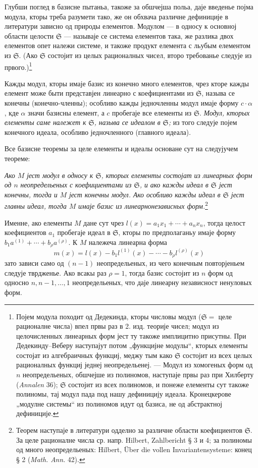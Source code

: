 ﻿\documentclass[11pt]{article}
\providecommand{\frS}{\mathfrak S}
\begin{document}
Глубши поглед в базисне пытаньа, такоже за обшчејша польа, даје введенье појма модула, кторы треба разумети тако, же он обхвача различне дефиниције в литератури зависно од природы елементов. Модулом --- в односу к основној области целости \(\frS\) --- называје се система елементов така, же разлика двох елементов опет належи системе, и такоже продукт елемента с льубым елементом из \(\frS\). (Ако \(\frS\) состојит из целых рационалных чисел, второ требованье следује из првого.)\footnote{Појем модула походит од Дедекинда, кторы числовы модул (\(\frS=\) целе рационалне числа) впел првы раз в 2. изд. теорије чисел; модул из целочисленных линеарных форм јест ту такоже имплицитно присутны. При Дедекинду--Веберу наступајут потом „функцијне модулы“, кторых елементы состојат из алгебраичных функциј, меджу тым како \(\frS\) состојит из всех целых рационалных функциј једнеј неопредельенеј. --- Модул из хомогеных форм од \(n\) неопредельеных, обшчејше из полиномов, наступаје првы раз при Хилберту (\emph{Annalen} 36); \(\frS\) состојит из всех полиномов, и понеже елементы сут такоже полиномы, тај модул пада под нашу дефиницију идеала. Кронецкерове „модулне системы“ из полиномов идут од базиса, не од абстрактној дефиниције.}

Кажды модул, кторы имаје базис из конечно много елементов, чрез кторе кажды елемент може быти представјен линеарно с коефициентами из \(\frS\), называ се конечны (конечно-членны); особливо кажды једночленны модул имаје форму \(c\cdot\alpha\), кде \(\alpha\) значи базисны елемент, а \(c\) пробегаје все елементы из \(\frS\). {\itshape Модул, кторых елементы саме належет к \(\frS\), называ се идеалом в \(\frS\);} из того следује појем конечного идеала, особливо једночленного (главного идеала).

Все базисне теоремы за целе елементы и идеалы основане сут на следујучем теореме:

{\itshape Ако \(M\) јест модул в односу к \(\frS\), кторых елементы состојат из линеарных форм од \(n\) неопредельеных с коефициентами из \(\frS\), и ако кажды идеал в \(\frS\) јест конечны, тогда и \(M\) јест конечны модул. Ако особливо кажды идеал в \(\frS\) јест главны идеал, тогда \(M\) имаје базис из линеарнонезависных форм.}\footnote{Теорем наступаје в литератури одделно за различне области коефициентов \(\frS\). За целе рационалне числа ср. напр. Hilbert, Zahlbericht § 3 и 4; за полиномы од много неопредельеных: Hilbert, Über die vollen Invariantensysteme: конец § 2 (\emph{Math. Ann.} 42).}

Именне, ако елементы \(M\) дане сут чрез \(l(x)=a_1x_1+\cdots+a_nx_n\), тогда целост коефициентов \(a_1\) пробегаје идеал в \(\frS\), кторы по предполаганьу имаје форму \(b_1a^{(1)}+\cdots+b_\rho a^{(\rho)}\). К \(M\) належеча линеарна форма
\[
m(x)=l(x)-b_1l^{(1)}(x)-\cdots-b_\rho l^{(\rho)}(x)
\]
зато зависи само од \((n-1)\) неопредельеных, из чего конечным повторјеньем следује тврдженье. Ако всакы раз \(\rho=1\), тогда базис состојит из \(n\) форм од односно \(n,n-1,\ldots,1\) неопредельеных, что даје линеарну независност ненуловых форм.
\end{document}
